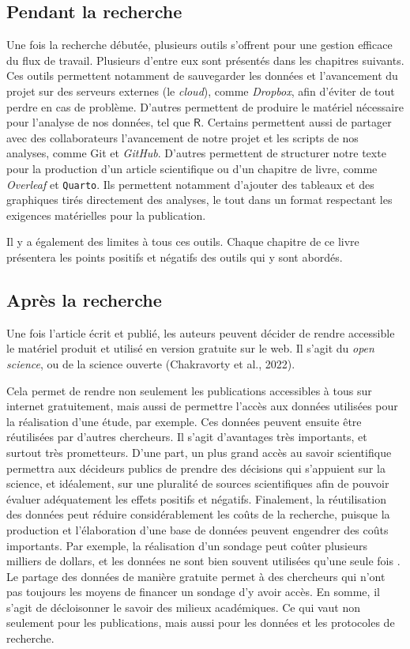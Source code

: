 \documentclass[
  letterpaper,
  DIV=11,
  numbers=noendperiod,
  oneside]{scrreprt}
\begin{document}
\hypertarget{pendant-la-recherche}{%
\subsection{Pendant la recherche}\label{pendant-la-recherche}}

Une fois la recherche débutée, plusieurs outils s'offrent pour une
gestion efficace du flux de travail. Plusieurs d'entre eux sont
présentés dans les chapitres suivants. Ces outils permettent notamment
de sauvegarder les données et l'avancement du projet sur des serveurs
externes (le \emph{cloud}), comme \emph{Dropbox}, afin d'éviter de tout
perdre en cas de problème. D'autres permettent de produire le matériel
nécessaire pour l'analyse de nos données, tel que \(\textsf{R}\).
Certains permettent aussi de partager avec des collaborateurs
l'avancement de notre projet et les scripts de nos analyses, comme Git
et \emph{GitHub}. D'autres permettent de structurer notre texte pour la
production d'un article scientifique ou d'un chapitre de livre, comme
\emph{Overleaf} et \texttt{Quarto}. Ils permettent notamment d'ajouter
des tableaux et des graphiques tirés directement des analyses, le tout
dans un format respectant les exigences matérielles pour la publication.

Il y a également des limites à tous ces outils. Chaque chapitre de ce
livre présentera les points positifs et négatifs des outils qui y sont
abordés.

\hypertarget{apruxe8s-la-recherche}{%
\subsection{Après la recherche}\label{apruxe8s-la-recherche}}

Une fois l'article écrit et publié, les auteurs peuvent décider de
rendre accessible le matériel produit et utilisé en version gratuite sur
le web. Il s'agit du \emph{open science}, ou de la science ouverte
(Chakravorty et al., 2022).

Cela permet de rendre non seulement les publications accessibles à tous
sur internet gratuitement, mais aussi de permettre l'accès aux données
utilisées pour la réalisation d'une étude, par exemple. Ces données
peuvent ensuite être réutilisées par d'autres chercheurs. Il s'agit
d'avantages très importants, et surtout très prometteurs. D'une part, un
plus grand accès au savoir scientifique permettra aux décideurs publics
de prendre des décisions qui s'appuient sur la science, et idéalement,
sur une pluralité de sources scientifiques afin de pouvoir évaluer
adéquatement les effets positifs et négatifs. Finalement, la
réutilisation des données peut réduire considérablement les coûts de la
recherche, puisque la production et l'élaboration d'une base de données
peuvent engendrer des coûts importants. Par exemple, la réalisation d'un
sondage peut coûter plusieurs milliers de dollars, et les données ne
sont bien souvent utilisées qu'une seule fois . Le partage des données
de manière gratuite permet à des chercheurs qui n'ont pas toujours les
moyens de financer un sondage d'y avoir accès. En somme, il s'agit de
décloisonner le savoir des milieux académiques. Ce qui vaut non
seulement pour les publications, mais aussi pour les données et les
protocoles de recherche.
\end{document}
